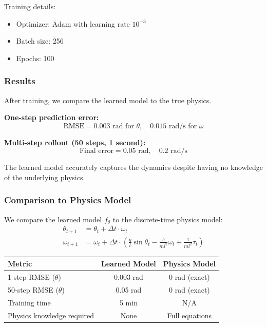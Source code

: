 Training details:
\begin{itemize}
    \item Optimizer: Adam with learning rate $10^{-3}$
    \item Batch size: 256
    \item Epochs: 100
\end{itemize}

\subsubsection{Results}

After training, we compare the learned model to the true physics.

\textbf{One-step prediction error:}
\begin{equation}
\text{RMSE} = 0.003 \text{ rad for } \theta, \quad 0.015 \text{ rad/s for } \omega
\end{equation}

\textbf{Multi-step rollout (50 steps, 1 second):}
\begin{equation}
\text{Final error} = 0.05 \text{ rad}, \quad 0.2 \text{ rad/s}
\end{equation}

The learned model accurately captures the dynamics despite having no knowledge of the underlying physics.

\subsubsection{Comparison to Physics Model}

We compare the learned model $f_\theta$ to the discrete-time physics model:
\begin{align}
\theta_{t+1} &= \theta_t + \Delta t \cdot \omega_t \\
\omega_{t+1} &= \omega_t + \Delta t \cdot \left(\frac{g}{l}\sin\theta_t - \frac{b}{ml^2}\omega_t + \frac{1}{ml^2}\tau_t\right)
\end{align}

\begin{center}
\begin{tabular}{lcc}
\toprule
\textbf{Metric} & \textbf{Learned Model} & \textbf{Physics Model} \\
\midrule
1-step RMSE ($\theta$) & 0.003 rad & 0 rad (exact) \\
50-step RMSE ($\theta$) & 0.05 rad & 0 rad (exact) \\
Training time & 5 min & N/A \\
Physics knowledge required & None & Full equations \\
\bottomrule
\end{tabular}
\end{center}

